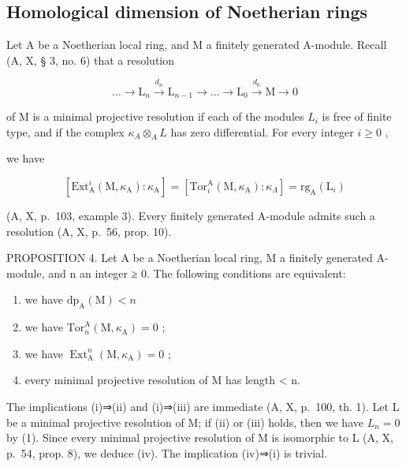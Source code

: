 \subsection{Homological dimension of Noetherian rings}

Let A be a Noetherian local ring, and M a finitely generated A-module. Recall (A, X, § 3, no. 6) that a resolution

\[
\dots \longrightarrow \mathrm{L} _ {n} \stackrel {d _ {n}} {\longrightarrow} \mathrm{L} _ {n - 1} \longrightarrow \dots \longrightarrow \mathrm{L} _ {0} \stackrel {d _ {0}} {\longrightarrow} \mathrm{M} \rightarrow 0
\]

of M is a minimal projective resolution if each of the modules \(L_{i}\) is free of finite type, and if the complex \(\kappa_{A} \otimes_{A} L\) has zero differential. For every integer \(i \geqslant 0\) ,

we have

\[
[ \mathrm{Ext} _ {\mathrm{A}} ^ {i} (\mathrm{M}, \kappa_ {\mathrm{A}}): \kappa_ {\mathrm{A}} ] = [ \mathrm{Tor} _ {i} ^ {\mathrm{A}} (\mathrm{M}, \kappa_ {\mathrm{A}}): \kappa_ {\Lambda} ] = \mathrm{rg} _ {\mathrm{A}} (\mathrm{L} _ {i})\tag{1}
\]

(A, X, p.~103, example 3). Every finitely generated A-module admits such a resolution (A, X, p.~56, prop. 10).

PROPOSITION 4. Let A be a Noetherian local ring, M a finitely generated A-module, and n an integer ≥ 0. The following conditions are equivalent:

\begin{enumerate}
\def\labelenumi{(\roman{enumi})}
\item
  we have \(\mathrm{dp}_{\mathrm{A}}(\mathrm{M}) < n\)
\item
  we have \(\mathrm{Tor}_n^{\mathrm{A}}(\mathrm{M},\kappa_{\mathrm{A}}) = 0\) ;
\item
  we have \(\operatorname{Ext}_{\mathrm{A}}^{n}(\mathrm{M},\kappa_{\mathrm{A}}) = 0\) ;
\item
  every minimal projective resolution of M has length \textless{} n.
\end{enumerate}

The implications (i)⇒(ii) and (i)⇒(iii) are immediate (A, X, p.~100, th. 1). Let L be a minimal projective resolution of M; if (ii) or (iii) holds, then we have \(L_{n}=0\) by (1). Since every minimal projective resolution of M is isomorphic to L (A, X, p.~54, prop. 8), we deduce (iv). The implication (iv)⇒(i) is trivial.

